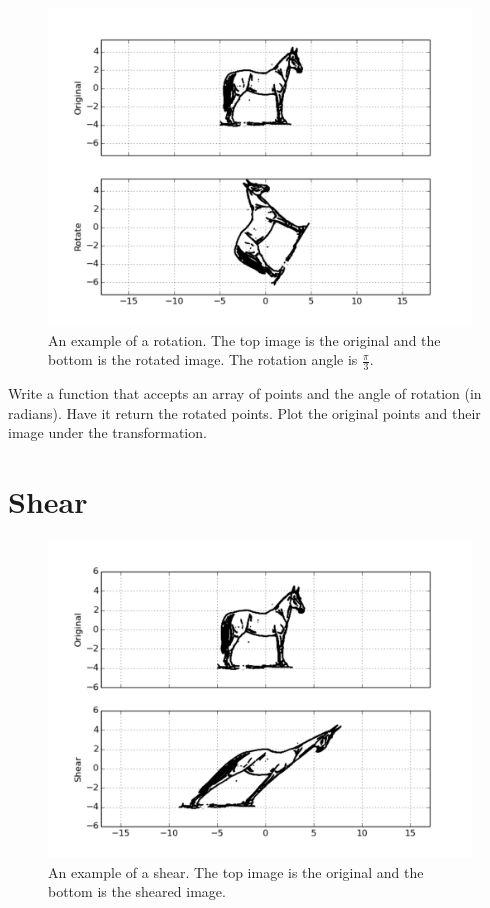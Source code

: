 \begin{figure}
\centering
\includegraphics[width=\textwidth]{rotate.pdf}
\caption{An example of a rotation.
The top image is the original and the bottom is the rotated image.
The rotation angle is $\frac{\pi}{3}$.}
\label{basis:rotate}
\end{figure}

\begin{problem}
Write a function that accepts an array of points and the angle of rotation (in
radians). Have it return the rotated points.
Plot the original points and their image under the transformation.
\end{problem}

\section*{Shear}

\begin{figure}
\centering
\includegraphics[width=\textwidth]{shear.pdf}
\caption{An example of a shear.
The top image is the original and the bottom is the sheared image.}
\label{basis:shear}
\end{figure}

